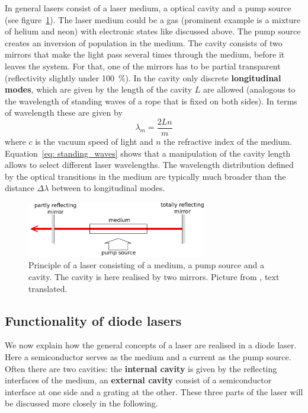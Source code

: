 In general lasers consist of a laser medium, a optical cavity and a pump source (see figure~\ref{fig: principle_laser}).
The laser medium could be a gas (prominent example is a mixture of helium and neon) with electronic states like discussed above. The pump source
creates an inversion of population in the medium. The cavity consists of two mirrors that make the light pass several times through the medium, before
it leaves the system. For that, one of the mirrors has to be partial transparent (reflectivity slightly under \SI{100}{\percent}). In the
cavity only discrete \textbf{longitudinal modes}, which are given by the length of the cavity $L$ are allowed (analogous 
to the wavelength of standing waves of a rope that is fixed on both sides). In terms of wavelength these are
given by
\begin{equation}
  \lambda_m = \frac{2 L n}{m}
  \label{eq: standing_waves}
\end{equation}
where $c$ is the vacuum speed of light and $n$ the refractive index of the medium. Equation~\eqref{eq: standing_waves} shows that a manipulation of the
cavity length allows to select different laser wavelengths. The wavelength distribution defined by the optical transitions in the medium 
are typically much broader than the distance $\Delta \lambda$ between to longitudinal modes. 

\begin{figure}
  \centering
  \includegraphics[width = 0.7\textwidth]{pics/prinzip_laser.png}
  \caption{Principle of a laser consisting of a medium, a pump source and a cavity. The cavity is here realised by two mirrors.
  Picture from \cite{anleitung61}, text translated.}
  \label{fig: principle_laser}
\end{figure}

\subsection{Functionality of diode lasers}
We now explain how the general concepts of a laser are realised in a diode laser. Here a semiconductor serves as the medium and a current as the pump source.
Often there are two cavities: the \textbf{internal cavity} is given by the reflecting interfaces of the medium, an \textbf{external cavity} consist of
a semiconductor interface at one side and a grating at the other. These three parts of the laser will be discussed more closely in the following.

